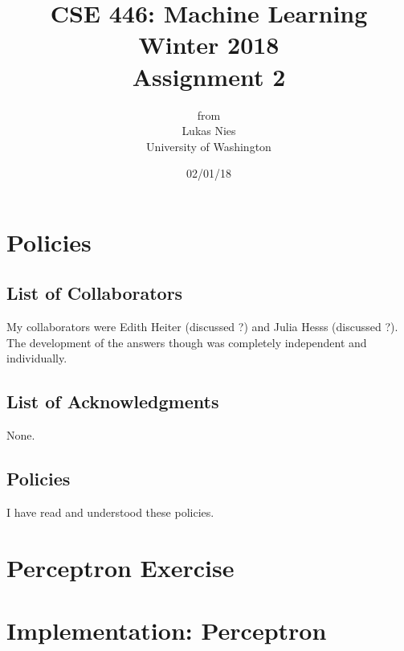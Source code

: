 \documentclass[12pt]{article}
\begin{document}
	
	\title{
		\textbf{\huge{CSE 446: Machine Learning Winter 2018 }} \\[2cm]
		\LARGE{Assignment 2}\\[1cm]
	}
	\author{from \\ Lukas Nies \\ University of Washington}
	\date{02/01/18}
	\clearpage\maketitle\thispagestyle{empty}
	\newpage

	\tableofcontents
	\setcounter{page}{0}
	\newpage
	
	\setcounter{section}{-1}
	

\section{Policies}

\subsection{List of Collaborators}

My collaborators were Edith Heiter (discussed ?) and Julia Hesss (discussed ?). The development of the answers though was completely independent and individually.

\subsection{List of Acknowledgments}

None.

\subsection{Policies}

I have read and understood these policies.

\section{Perceptron Exercise}



\section{Implementation: Perceptron}
\end{document}
